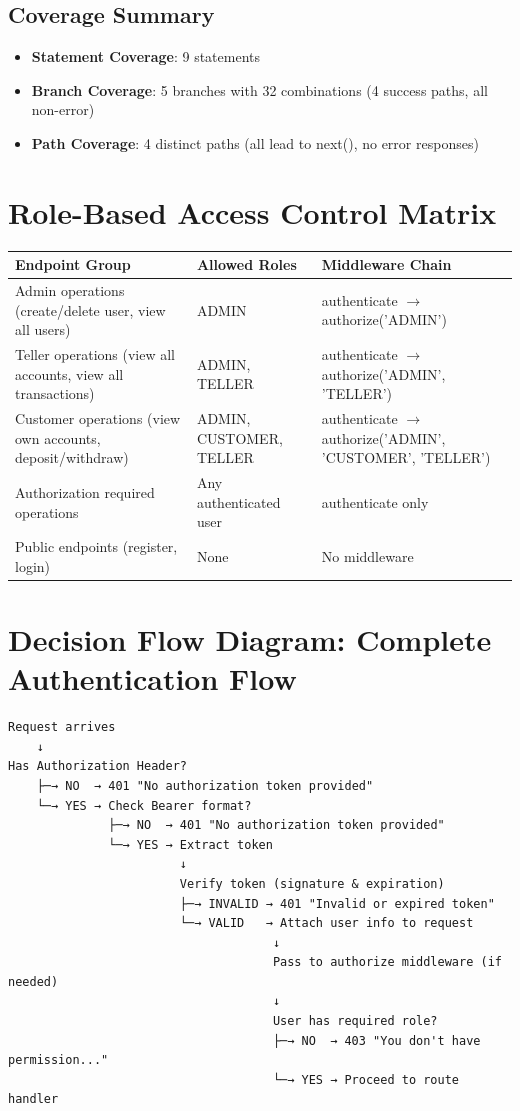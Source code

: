 \subsection{Coverage Summary}
\begin{itemize}
    \item \textbf{Statement Coverage}: 9 statements
    \item \textbf{Branch Coverage}: 5 branches with 32 combinations (4 success paths, all non-error)
    \item \textbf{Path Coverage}: 4 distinct paths (all lead to next(), no error responses)
\end{itemize}

\section{Role-Based Access Control Matrix}

\begin{longtable}{|L{3cm}|L{3.5cm}|L{3.5cm}|}
\hline
\textbf{Endpoint Group} & \textbf{Allowed Roles} & \textbf{Middleware Chain} \\
\hline
Admin operations (create/delete user, view all users) & ADMIN & authenticate $\rightarrow$ authorize('ADMIN') \\
\hline
Teller operations (view all accounts, view all transactions) & ADMIN, TELLER & authenticate $\rightarrow$ authorize('ADMIN', 'TELLER') \\
\hline
Customer operations (view own accounts, deposit/withdraw) & ADMIN, CUSTOMER, TELLER & authenticate $\rightarrow$ authorize('ADMIN', 'CUSTOMER', 'TELLER') \\
\hline
Authorization required operations & Any authenticated user & authenticate only \\
\hline
Public endpoints (register, login) & None & No middleware \\
\hline
\end{longtable}

\section{Decision Flow Diagram: Complete Authentication Flow}

\begin{verbatim}
Request arrives
    ↓
Has Authorization Header?
    ├─→ NO  → 401 "No authorization token provided"
    └─→ YES → Check Bearer format?
              ├─→ NO  → 401 "No authorization token provided"
              └─→ YES → Extract token
                        ↓
                        Verify token (signature & expiration)
                        ├─→ INVALID → 401 "Invalid or expired token"
                        └─→ VALID   → Attach user info to request
                                     ↓
                                     Pass to authorize middleware (if needed)
                                     ↓
                                     User has required role?
                                     ├─→ NO  → 403 "You don't have permission..."
                                     └─→ YES → Proceed to route handler
\end{verbatim}

